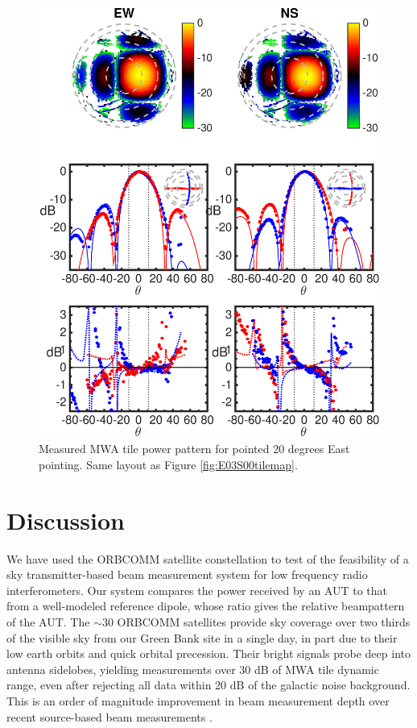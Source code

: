 \begin{figure}
\includegraphics[width=5in]{chap1_precision_beammapping_figures/W03S00_abs.eps}
\caption[The measured MWA tile beampattern for the 20 degree East pointing.]{Measured MWA tile power pattern for pointed 20 degrees East pointing. Same layout as Figure \ref{fig:E03S00tilemap}.}
\label{fig:W03S00tilemap}
\end{figure}


\section{Discussion}
\label{sec:discussion}

We have used the ORBCOMM satellite constellation to test of the feasibility of a sky transmitter-based beam measurement system for low frequency radio interferometers. Our system compares the power received by an AUT to that from a well-modeled reference dipole, whose ratio gives the relative beampattern of the AUT. The $\sim30$ ORBCOMM satellites provide sky coverage over two thirds of the visible sky from our Green Bank site in a single day, in part due to their low earth orbits and quick orbital precession. Their bright signals probe deep into antenna sidelobes, yielding measurements over 30 dB of MWA tile dynamic range, even after rejecting all data within 20 dB of the galactic noise background. This is an order of magnitude improvement in beam measurement depth over recent source-based beam measurements \citep{colegate14}.

